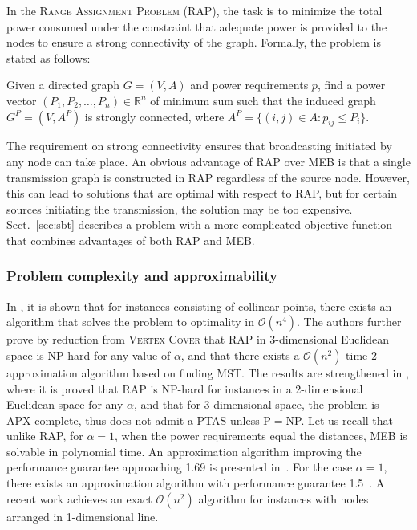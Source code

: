 In the \textsc{Range Assignment Problem} (RAP), the task is to minimize the total power consumed under the constraint 
that adequate power is provided to the nodes to ensure a strong connectivity of the graph.
Formally, the problem is stated as follows:
\begin{problem}
Given a directed graph $G=(V,A)$ and power requirements $p$, find a power vector $(P_1,P_2,\dots,P_n)\in\mathbb{R}^n$ of minimum sum such that the induced graph $G^P=(V,A^P)$ is strongly connected, 
where $A^P=\{(i,j)\in A: p_{ij}\leq P_i\}$.
\end{problem}
The requirement on strong connectivity ensures that broadcasting initiated by any node can take place.
An obvious advantage of RAP over MEB is that a single transmission graph is constructed in RAP regardless of the source node.
However, this can lead to solutions that are optimal with respect to RAP, but for certain sources initiating the transmission, the solution may be too expensive.
Sect.~\ref{sec:sbt} describes a problem with a more complicated objective function that combines advantages of both RAP and MEB.

\subsubsection{Problem complexity and approximability}

In \cite{kirousis00}, it is shown that for instances consisting of collinear points, there exists an algorithm that solves the problem to optimality in $\mathcal{O}(n^4)$.
The authors further prove by reduction from \textsc{Vertex Cover} that RAP in 3-dimensional Euclidean space is NP-hard for any value of $\alpha$,
and that there exists a $\mathcal{O}(n^2)$ time 2-approximation algorithm based on finding MST.
The results are strengthened in \cite{clementi99}, where it is proved that RAP is NP-hard for instances in a 2-dimensional Euclidean space for any $\alpha$, 
and that for 3-dimensional space, the problem is APX-complete, thus does not admit a PTAS unless P$=$NP.
Let us recall that unlike RAP, for $\alpha=1$, when the power requirements equal the distances, MEB  is solvable in polynomial time.
An approximation algorithm improving the performance guarantee approaching 1.69 is presented in~\cite{calinescu02}.
For the case $\alpha=1$, there exists an approximation algorithm with performance guarantee 1.5~\cite{ambuhl03}.
A recent work \cite{carmi15} achieves an exact $\mathcal{O}(n^2)$ algorithm for instances with nodes arranged in 1-dimensional line.

